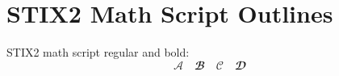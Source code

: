 \documentclass{article}
\begin{document}
\section{STIX2 Math Script Outlines}

STIX2 math script regular and bold:
\[
  \mathscr{A} \quad \mathbfscr{B} \quad \mathcal{C} \quad \mathbfcal{D}
\]
\end{document}
